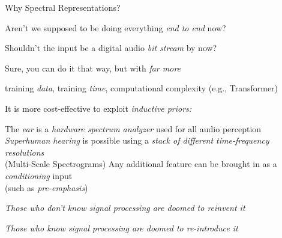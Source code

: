 \begin{slide}[\slideopts,toc={Spectra}]{Why Spectral Representations?}

  Aren't we supposed to be doing everything \emph{end to end} now?

  Shouldn't the input be a digital audio \emph{bit stream} by now?

  \begin{itemize}

    \mpitem Sure, you can do it that way, but with \emph{far more}
    \begin{itemize}
      \mpitem training \emph{data},
      \mpitem training \emph{time}, 
      \mpitem computational complexity (e.g., Transformer)
    \end{itemize}
    \mpitem It is more cost-effective to exploit \emph{inductive priors:}
    \begin{itemize}
      \mpitem The \emph{ear} is a \emph{hardware spectrum analyzer} used for all audio perception
      \mpitem \emph{Superhuman hearing} is possible using a \emph{stack of different time-frequency resolutions}\\
      (Multi-Scale Spectrograms)
      \mpitem Any additional feature can be brought in as a \emph{conditioning} input\\
      (such as \emph{pre-emphasis})
    \end{itemize}

  \end{itemize}

  \vspace{-1em}
\maybepause
    \centerline{\textit{Those who don't know signal processing are doomed to reinvent it}}
\maybepause
    \centerline{\textit{Those who know signal processing are doomed to re-introduce it}}

\end{slide}

